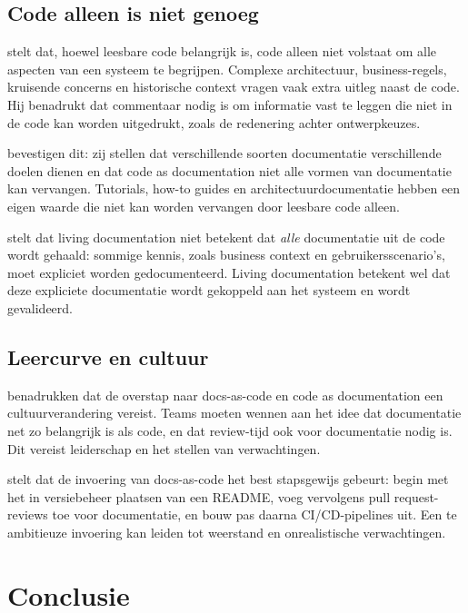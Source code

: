 \subsection{Code alleen is niet genoeg}
\textcite{ousterhout2018philosophy} stelt dat, hoewel leesbare code belangrijk is, code alleen niet volstaat om alle aspecten van een systeem te begrijpen. Complexe architectuur, business-regels, kruisende concerns en historische context vragen vaak extra uitleg naast de code. Hij benadrukt dat commentaar nodig is om informatie vast te leggen die niet in de code kan worden uitgedrukt, zoals de redenering achter ontwerpkeuzes.

\textcite{bhatti2021docsdevelopers} bevestigen dit: zij stellen dat verschillende soorten documentatie verschillende doelen dienen en dat code as documentation niet alle vormen van documentatie kan vervangen. Tutorials, how-to guides en architectuurdocumentatie hebben een eigen waarde die niet kan worden vervangen door leesbare code alleen.

\textcite{martraire2019livingdocumentation} stelt dat living documentation niet betekent dat \textit{alle} documentatie uit de code wordt gehaald: sommige kennis, zoals business context en gebruikersscenario's, moet expliciet worden gedocumenteerd. Living documentation betekent wel dat deze expliciete documentatie wordt gekoppeld aan het systeem en wordt gevalideerd.

\subsection{Leercurve en cultuur}
\textcite{bhatti2021docsdevelopers} benadrukken dat de overstap naar docs-as-code en code as documentation een cultuurverandering vereist. Teams moeten wennen aan het idee dat documentatie net zo belangrijk is als code, en dat review-tijd ook voor documentatie nodig is. Dit vereist leiderschap en het stellen van verwachtingen.

\textcite{gentle2017docslikecode} stelt dat de invoering van docs-as-code het best stapsgewijs gebeurt: begin met het in versiebeheer plaatsen van een README, voeg vervolgens pull request-reviews toe voor documentatie, en bouw pas daarna CI/CD-pipelines uit. Een te ambitieuze invoering kan leiden tot weerstand en onrealistische verwachtingen.

\section{Conclusie}
\label{sec:cad-conclusie}

